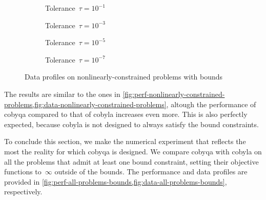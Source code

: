 \begin{figure}[ht]
    \centering
    \begin{subfigure}[b]{0.49\textwidth}
        \centering
        \caption{Tolerance~$\tau = 10^{-1}$}
    \end{subfigure}
    \hfill
    \begin{subfigure}[b]{0.49\textwidth}
        \centering
        \caption{Tolerance~$\tau = 10^{-3}$}
    \end{subfigure}
    \begin{subfigure}[b]{0.49\textwidth}
        \centering
        \caption{Tolerance~$\tau = 10^{-5}$}
    \end{subfigure}
    \hfill
    \begin{subfigure}[b]{0.49\textwidth}
        \centering
        \caption{Tolerance~$\tau = 10^{-7}$}
    \end{subfigure}
    \caption{Data profiles on nonlinearly-constrained problems with bounds}
    \label{fig:data-nonlinearly-constrained-problems-bounds}
\end{figure}

The results are similar to the ones in \cref{fig:perf-nonlinearly-constrained-problems,fig:data-nonlinearly-constrained-problems}, altough the performance of \gls{cobyqa} compared to that of \gls{cobyla} increases even more.
This is also perfectly expected, because \gls{cobyla} is not designed to always satisfy the bound constraints.

To conclude this section, we make the numerical experiment that reflects the most the reality for which \gls{cobyqa} is designed.
We compare \gls{cobyqa} with \gls{cobyla} on all the problems that admit at least one bound constraint, setting their objective functions to~$\infty$ outside of the bounds.
The performance and data profiles are provided in \cref{fig:perf-all-problems-bounds,fig:data-all-problems-bounds}, respectively.

